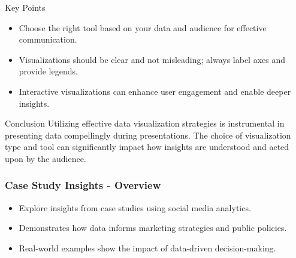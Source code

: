 \documentclass{beamer}
\begin{document}
\begin{frame}[fragile]
    \begin{block}{Key Points}
        \begin{itemize}
            \item Choose the right tool based on your data and audience for effective communication.
            \item Visualizations should be clear and not misleading; always label axes and provide legends.
            \item Interactive visualizations can enhance user engagement and enable deeper insights.
        \end{itemize}
    \end{block}

    \begin{block}{Conclusion}
        Utilizing effective data visualization strategies is instrumental in presenting data compellingly during presentations. The choice of visualization type and tool can significantly impact how insights are understood and acted upon by the audience.
    \end{block}
\end{frame}

\begin{frame}[fragile]
    \frametitle{Case Study Insights - Overview}
    \begin{itemize}
        \item Explore insights from case studies using social media analytics.
        \item Demonstrates how data informs marketing strategies and public policies.
        \item Real-world examples show the impact of data-driven decision-making.
    \end{itemize}
\end{frame}
\end{document}
